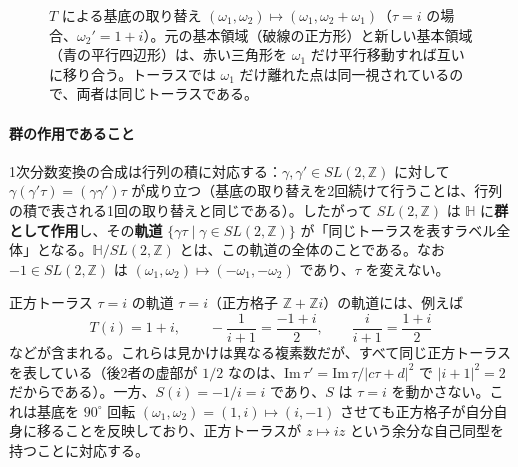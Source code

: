 \documentclass[uplatex, dvipdfmx, book]{jsbook}
\begin{document}
\begin{figure}[htbp]
\centering
{}
\caption{$T$ による基底の取り替え $(\omega_1, \omega_2) \mapsto (\omega_1, \omega_2 + \omega_1)$（$\tau = i$ の場合、$\omega_2' = 1 + i$）。元の基本領域（破線の正方形）と新しい基本領域（青の平行四辺形）は、赤い三角形を $\omega_1$ だけ平行移動すれば互いに移り合う。トーラスでは $\omega_1$ だけ離れた点は同一視されているので、両者は同じトーラスである。}
\label{fig:T-cut-paste}
\end{figure}

\paragraph{群の作用であること}
1次分数変換の合成は行列の積に対応する：$\gamma, \gamma' \in SL(2,\mathbb{Z})$ に対して $\gamma(\gamma'\tau) = (\gamma\gamma')\tau$ が成り立つ（基底の取り替えを2回続けて行うことは、行列の積で表される1回の取り替えと同じである）。したがって $SL(2,\mathbb{Z})$ は $\mathbb{H}$ に\textbf{群として作用}し、その\textbf{軌道} $\{\gamma\tau \mid \gamma \in SL(2,\mathbb{Z})\}$ が「同じトーラスを表すラベル全体」となる。$\mathbb{H}/SL(2,\mathbb{Z})$ とは、この軌道の全体のことである。なお $-1 \in SL(2,\mathbb{Z})$ は $(\omega_1, \omega_2) \mapsto (-\omega_1, -\omega_2)$ であり、$\tau$ を変えない。

\begin{myex}{正方トーラス $\tau = i$ の軌道}{}
$\tau = i$（正方格子 $\mathbb{Z} + \mathbb{Z}i$）の軌道には、例えば
\begin{equation*}
    T(i) = 1 + i, \qquad -\frac{1}{i + 1} = \frac{-1 + i}{2}, \qquad \frac{i}{i + 1} = \frac{1 + i}{2}
\end{equation*}
などが含まれる。これらは見かけは異なる複素数だが、すべて同じ正方トーラスを表している（後2者の虚部が $1/2$ なのは、$\mathrm{Im}\,\tau' = \mathrm{Im}\,\tau/|c\tau+d|^2$ で $|i + 1|^2 = 2$ だからである）。一方、$S(i) = -1/i = i$ であり、$S$ は $\tau = i$ を動かさない。これは基底を $90^\circ$ 回転 $(\omega_1, \omega_2) = (1, i) \mapsto (i, -1)$ させても正方格子が自分自身に移ることを反映しており、正方トーラスが $z \mapsto iz$ という余分な自己同型を持つことに対応する。
\end{myex}
\end{document}
